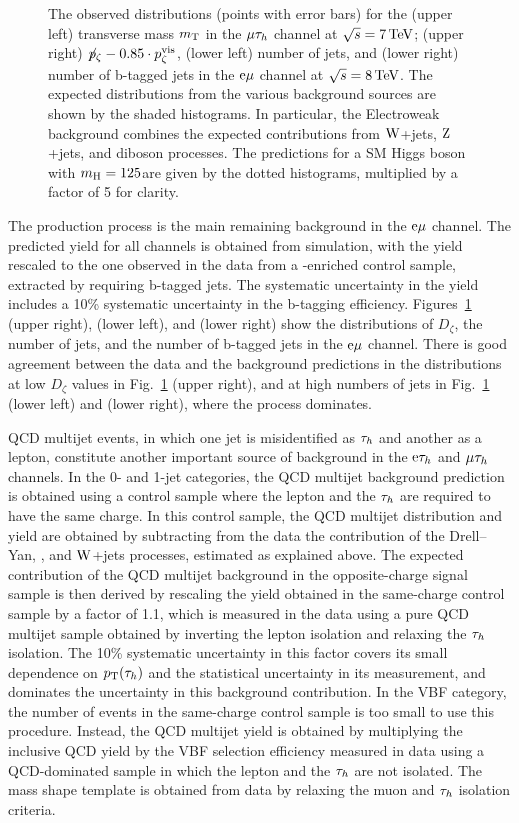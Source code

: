 \documentclass[11pt,twoside,a4paper,cmspaper,final,collab]{cms-tdr}
\begin{document}
\begin{figure}[t!]
\caption{The observed distributions (points with error bars) for the (upper left) transverse mass $m_\mathrm{T}$ in the ${\mu}\tau_h$ channel at $\sqrt{s}=7\,\text{Te\hspace{-.08em}V}$;
(upper right) $\not\! p_\zeta- 0.85 \cdot p_\zeta^{\mathrm{vis}}$, (lower left) number of jets, and (lower right) number of b-tagged jets in the $\mathrm{e}{\mu}$ channel at $\sqrt{s}=8\,\text{Te\hspace{-.08em}V}$.
The expected distributions from the various background sources are shown by the shaded histograms.
In particular, the Electroweak background combines the expected contributions from $\mathrm{W}$+jets, $\mathrm{Z}$+jets, and diboson processes.
The predictions for a SM Higgs boson with $m_{\mathrm{H}}=125$\GeV are given by the dotted histograms, multiplied by a factor of 5 for clarity.}
\label{fig:htt_control}
\end{figure}

The \ttbar production process is the main remaining background in the $\mathrm{e}{\mu}$ channel.
The predicted yield for all channels is obtained from simulation, with the yield rescaled to the one observed in the data from
a \ttbar-enriched control sample, extracted by requiring b-tagged jets.
The systematic uncertainty in the yield includes a 10\% systematic uncertainty in the b-tagging efficiency.
Figures~\ref{fig:htt_control} (upper right), (lower left), and (lower right) show the distributions of $D_\zeta$, the number of jets, and
the number of b-tagged jets in the $\mathrm{e}{\mu}$ channel.
There is good agreement between the data and the background predictions in the distributions at
low $D_\zeta$ values in Fig.~\ref{fig:htt_control} (upper right), and at high numbers of jets in
Fig.~\ref{fig:htt_control} (lower left) and (lower right), where the \ttbar process dominates.

QCD multijet events, in which one jet is misidentified as $\tau_h$ and another as a lepton, constitute another important source
of background in the $\mathrm{e}\tau_h$ and  ${\mu}\tau_h$ channels.
In the 0- and 1-jet categories, the QCD multijet background prediction is obtained using a control sample where the
lepton and the $\tau_h$ are required to have the same charge.
In this control sample, the QCD multijet distribution and yield are obtained by subtracting from the data the contribution of the Drell--Yan, \ttbar,
and $\mathrm{W}$+jets processes, estimated as explained above.
The expected contribution of the QCD multijet background in the opposite-charge signal sample is then derived by rescaling the yield obtained in the same-charge control sample by a factor of 1.1,
which is measured in the data using a pure QCD multijet sample obtained by inverting the lepton isolation
and relaxing the $\tau_h$ isolation.
The 10\% systematic uncertainty in this factor covers its small dependence on $p_{\mathrm{T}}(\tau_h)$ and the statistical uncertainty in its measurement, and dominates the uncertainty in this background contribution.
In the VBF category, the number of events in the same-charge control sample is too small to use this procedure.
Instead, the QCD multijet yield is obtained by multiplying the inclusive QCD yield
by the VBF selection efficiency measured in  data using a QCD-dominated sample in which the lepton and the $\tau_h$ are not isolated.
The mass shape template is obtained from data by relaxing the muon and $\tau_h$ isolation criteria.
\end{document}
